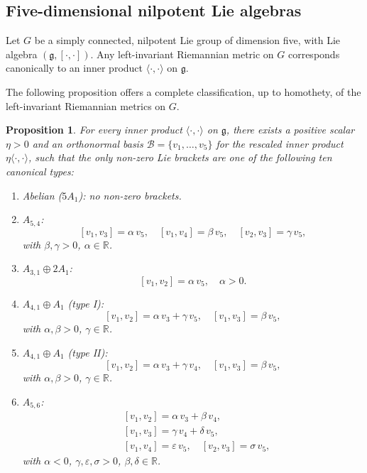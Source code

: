 \documentclass[10pt]{article}
\newtheorem{Proposition}{Proposition}
\begin{document}
    \subsection{Five-dimensional nilpotent Lie algebras}
 Let \(G\) be a simply connected, nilpotent Lie group of dimension five, with Lie algebra \((\mathfrak{g},[\cdot,\cdot])\). Any left-invariant Riemannian metric on \(G\) corresponds canonically to an inner product \(\langle\cdot,\cdot\rangle\) on \(\mathfrak{g}\).

The following proposition offers a complete classification, up to homothety, of the left-invariant Riemannian metrics on \(G\).


\begin{Proposition} \cite{Fok} \label{fok}
    For every inner product \(\langle\cdot,\cdot\rangle\) on \(\mathfrak{g}\), there exists a positive scalar \(\eta>0\) and an orthonormal basis \(\mathcal{B}=\{v_1,\dots,v_5\}\) for the rescaled inner product \(\eta\langle\cdot,\cdot\rangle\), such that the only non-zero Lie brackets are one of the following ten canonical types:

\begin{enumerate}
  \item Abelian (\(5A_1\)): no non-zero brackets.

  \item \(A_{5,4}\):
  \[
    [v_1,v_3]=\alpha\,v_5,\quad [v_1,v_4]=\beta\,v_5,\quad [v_2,v_3]=\gamma\,v_5,
  \]
  with \(\beta,\gamma>0\), \(\alpha\in\mathbb{R}\).

  \item \(A_{3,1}\oplus2A_1\):
  \[
    [v_1,v_2]=\alpha\,v_5,\quad \alpha>0.
  \]

  \item \(A_{4,1}\oplus A_1\) (type I):
  \[
    [v_1,v_2]=\alpha\,v_3+\gamma\,v_5,\quad [v_1,v_3]=\beta\,v_5,
  \]
  with \(\alpha,\beta>0\), \(\gamma\in\mathbb{R}\).

  \item \(A_{4,1}\oplus A_1\) (type II):
  \[
    [v_1,v_2]=\alpha\,v_3+\gamma\,v_4,\quad [v_1,v_3]=\beta\,v_5,
  \]
  with \(\alpha,\beta>0\), \(\gamma\in\mathbb{R}\).

  \item \(A_{5,6}\):
  \[
  \begin{aligned}
    &[v_1,v_2]=\alpha\,v_3+\beta\,v_4,\\
    &[v_1,v_3]=\gamma\,v_4+\delta\,v_5,\\
    &[v_1,v_4]=\varepsilon\,v_5,\quad [v_2,v_3]=\sigma\,v_5,
  \end{aligned}
  \]
  with \(\alpha<0\), \(\gamma,\varepsilon,\sigma>0\), \(\beta,\delta\in\mathbb{R}\).


\end{enumerate}
\end{Proposition}
\end{document}
